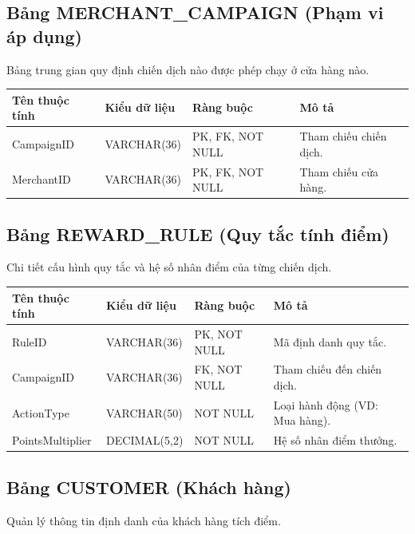 \subsection{Bảng MERCHANT\_CAMPAIGN (Phạm vi áp dụng)}
Bảng trung gian quy định chiến dịch nào được phép chạy ở cửa hàng nào.

\begin{table}[htbp]
    \centering
    \renewcommand{\arraystretch}{1.3}
    \begin{tabular}{|p{3cm}|p{3.2cm}|>{\raggedright\arraybackslash}p{3.2cm}|>{\raggedright\arraybackslash}p{4.8cm}|}
        \hline
        \textbf{Tên thuộc tính} & \textbf{Kiểu dữ liệu} & \textbf{Ràng buộc} & \textbf{Mô tả} \\ \hline
        CampaignID & VARCHAR(36) & PK, FK, NOT NULL & Tham chiếu chiến dịch. \\ \hline
        MerchantID & VARCHAR(36) & PK, FK, NOT NULL & Tham chiếu cửa hàng. \\ \hline
    \end{tabular}
\end{table}

\subsection{Bảng REWARD\_RULE (Quy tắc tính điểm)}
Chi tiết cấu hình quy tắc và hệ số nhân điểm của từng chiến dịch.

\begin{table}[htbp]
    \centering
    \renewcommand{\arraystretch}{1.3}
    \begin{tabular}{|p{3cm}|p{3.2cm}|>{\raggedright\arraybackslash}p{3.2cm}|>{\raggedright\arraybackslash}p{4.8cm}|}
        \hline
        \textbf{Tên thuộc tính} & \textbf{Kiểu dữ liệu} & \textbf{Ràng buộc} & \textbf{Mô tả} \\ \hline
        RuleID & VARCHAR(36) & PK, NOT NULL & Mã định danh quy tắc. \\ \hline
        CampaignID & VARCHAR(36) & FK, NOT NULL & Tham chiếu đến chiến dịch. \\ \hline
        ActionType & VARCHAR(50) & NOT NULL & Loại hành động (VD: Mua hàng). \\ \hline
        PointsMultiplier & DECIMAL(5,2) & NOT NULL & Hệ số nhân điểm thưởng. \\ \hline
    \end{tabular}
\end{table}

\subsection{Bảng CUSTOMER (Khách hàng)}
Quản lý thông tin định danh của khách hàng tích điểm.


